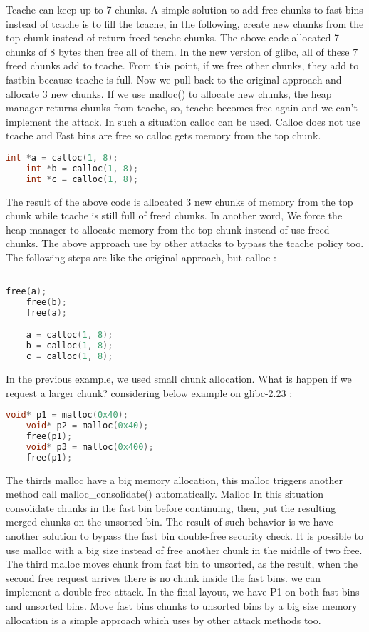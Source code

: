\documentclass{masterthesis}
\newcommand*\libc{glibc}
\begin{document}
Tcache can keep up to 7 chunks. A simple solution to add free chunks to fast bins instead of tcache is to fill the tcache, in the following, create new chunks from the top chunk instead of return freed tcache chunks. The above code allocated 7 chunks of 8 bytes then free all of them. In the new version of \libc{}, all of these 7 freed chunks add to tcache. From this point, if we free other chunks, they add to fastbin because tcache is full. Now we pull back to the original approach and allocate 3 new chunks. If we use malloc() to allocate new chunks, the heap manager returns chunks from tcache, so, tcache becomes free again and we can’t implement the attack. In such a situation calloc can be used. Calloc does not use tcache and Fast bins are free so calloc gets memory from the top chunk. 

\begin{lstlisting}[language=c,frame=tlrb]
	int *a = calloc(1, 8);
	int *b = calloc(1, 8);
	int *c = calloc(1, 8);
\end{lstlisting}

The result of the above code is allocated 3 new chunks of memory from the top chunk while tcache is still full of freed chunks. In another word, We force the heap manager to allocate memory from the top chunk instead of use freed chunks. The above approach use by other attacks to bypass the tcache policy too. The following steps are like the original approach, but calloc :

\begin{lstlisting}[language=c,frame=tlrb]

free(a);
	free(b);
	free(a);

	a = calloc(1, 8);
	b = calloc(1, 8);
	c = calloc(1, 8);
\end{lstlisting}

In the previous example, we used small chunk allocation. What is happen if we request a larger chunk? considering below example on \libc{-2.23} :

\begin{lstlisting}[language=c,frame=tlrb]
 	void* p1 = malloc(0x40);
	void* p2 = malloc(0x40);
 	free(p1);
	void* p3 = malloc(0x400);
	free(p1);
\end{lstlisting}

The thirds malloc have a big memory allocation, this malloc triggers another method call malloc\_consolidate() automatically. Malloc In this situation consolidate chunks in the fast bin before continuing, then, put the resulting merged chunks on the unsorted bin.
The result of such behavior is we have another solution to bypass the fast bin double-free security check. It is possible to use malloc with a big size instead of free another chunk in the middle of two free. The third malloc moves chunk from fast bin to unsorted, as the result, when the second free request arrives there is no chunk inside the fast bins. we can implement a double-free attack. In the final layout, we have P1 on both fast bins and unsorted bins. Move fast bins chunks to unsorted bins by a big size memory allocation is a simple approach which uses by other attack methods too.
\end{document}
